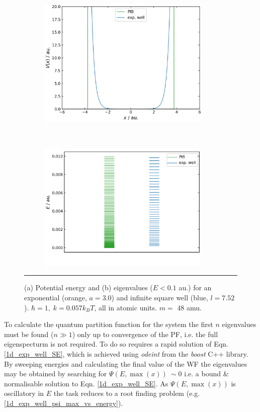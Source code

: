 \documentclass[../main.tex]{subfiles}
\begin{document}
\begin{figure}[h!]

	\begin{subfigure}[t]{0.49\textwidth}
		\centering
		\includegraphics[height=6.2cm]{4/figs/1d_exp_well_pib_potential}
		\caption{}
	\end{subfigure}%
	~ 
	\begin{subfigure}[t]{0.49\textwidth}
		\centering
		\includegraphics[height=6.2cm]{4/figs/1d_exp_well_pib_eigenvalues}
		\caption{}
	\end{subfigure}
	\vspace{0.2cm}
	\hrule
	\caption{(a) Potential energy and (b) eigenvalues ($E < 0.1$ au.) for an exponential (orange, $a = 3.0$) and infinite square well (blue, $ l = 7.52$). $\hbar = 1,\; k = 0.057 k_B T$, all in atomic units. $m =$ 48 amu.} 
	\label{1d_exp_well_pib_potential_eigenvalues}
\end{figure}

To calculate the quantum partition function for the system the first $n$ eigenvalues must be found ($n \gg 1$) only up to convergence of the PF, i.e. the full eigenspecturm is not required. To do so requires a rapid solution of Eqn. \eqref{1d_exp_well_SE}, which is achieved using \emph{odeint} from the \emph{boost} C++ library. \cite{Ahnert2011} By sweeping energies and calculating the final value of the WF the eigenvalues may be obtained by searching for $\Psi(E, \max(x)) \ \sim 0$ i.e. a bound \& normalisable solution to Eqn. \eqref{1d_exp_well_SE}. As $\Psi(E, \max(x))$ is oscillatory in $E$ the task reduces to a root finding problem (e.g. \figurename{ \ref{1d_exp_well_psi_max_vs_energy}}).
\end{document}
